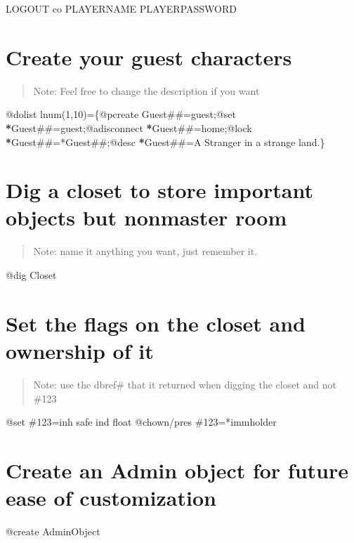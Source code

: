 \documentclass[letterpaper,10pt,english]{sphinxmanual}
\begin{document}
\sphinxAtStartPar
LOGOUT
co PLAYERNAME PLAYERPASSWORD


\section{Create your guest characters}
\label{\detokenize{05-newmush:create-your-guest-characters}}\begin{quote}

\sphinxAtStartPar
Note: Feel free to change the description if you want
\end{quote}

\sphinxAtStartPar
@dolist lnum(1,10)=\{@pcreate Guest\#\#=guest;@set {\color{red}\bfseries{}*}Guest\#\#=guest;@adisconnect {\color{red}\bfseries{}*}Guest\#\#=home;@lock {\color{red}\bfseries{}*}Guest\#\#=*Guest\#\#;@desc {\color{red}\bfseries{}*}Guest\#\#=A Stranger in a strange land.\}


\section{Dig a closet to store important objects but non\sphinxhyphen{}master room}
\label{\detokenize{05-newmush:dig-a-closet-to-store-important-objects-but-non-master-room}}\begin{quote}

\sphinxAtStartPar
Note: name it anything you want, just remember it.
\end{quote}

\sphinxAtStartPar
@dig Closet


\section{Set the flags on the closet and ownership of it}
\label{\detokenize{05-newmush:set-the-flags-on-the-closet-and-ownership-of-it}}\begin{quote}

\sphinxAtStartPar
Note: use the dbref\# that it returned when digging the closet and not \#123
\end{quote}

\sphinxAtStartPar
@set \#123=inh safe ind float
@chown/pres \#123=*immholder


\section{Create an Admin object for future ease of customization}
\label{\detokenize{05-newmush:create-an-admin-object-for-future-ease-of-customization}}
\sphinxAtStartPar
@create AdminObject
\end{document}
